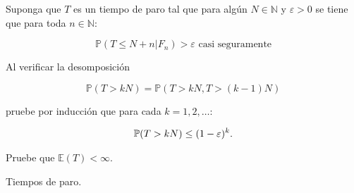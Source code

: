 \begin{problema}
		Suponga que \(T\) es un tiempo de paro tal que para algún 
		\(N\in\mathbb{N}\) y \(\varepsilon>0\) se tiene que para toda \(n\in\mathbb{N}\):
		
        \begin{equation}\label{problema1_2:hipotesis_del_problema}
		\mathbb{P} (T \leq N + n | F_n) > \varepsilon \text{ casi seguramente}
		\end{equation}
		
        Al verificar la desomposici\'on
		
        \begin{equation}\label{problema1_2:sugerencia_del_problema}
			\mathbb{P} (T>kN)= \mathbb{P} (T>kN,T>(k-1)N)
		\end{equation}
		
        pruebe por inducci\'on que para cada \(k=1,2,\ldots\):
		
        \begin{align}
			\mathbb{P}(T>kN)\leq (1-\varepsilon)^k.
		\end{align}
		
        Pruebe que \( \mathbb{E}(T)<\infty \). 
	\begin{categoria} Tiempos de paro.\end{categoria}
\end{problema}
\afterstatement
